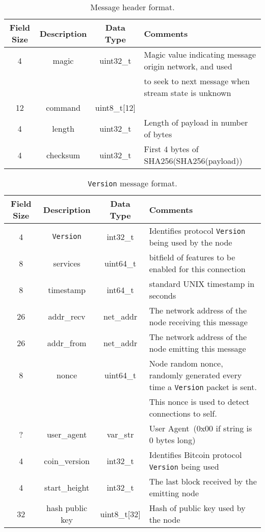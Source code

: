 \begin{table*}
\begin{center}
\caption{Message header format.}
\label{tab:msg-header}
    \begin{tabular}{|c|c|c|l|} \hline
    \textbf{Field Size} & {\bf Description} & {\bf Data Type} & {\bf Comments} \\ \hline
    4 & magic & uint32\_t & Magic value indicating message origin network, and used \\
    ~ & ~ & ~ & to seek to next message when stream state is unknown \\
    12 & command & uint8\_t[12] & ~ \\
    4 & length & uint32\_t & Length of payload in number of bytes \\
    4 & checksum & uint32\_t & First 4 bytes of SHA256(SHA256(payload)) \\ \hline
    \end{tabular}
\end{center}
\end{table*}

\begin{table*}[ht!]
\begin{center}
\caption{{\tt Version} message format.}
\label{tab:msg-version}
    \begin{tabular}{|c|c|c|l|} \hline
    \textbf{Field Size} & {\bf Description} & {\bf Data Type} & {\bf Comments} \\ \hline
    4 & {\tt Version} & int32\_t & Identifies protocol {\tt Version} being used by the node \\
    8 & services & uint64\_t & bitfield of features to be enabled for this connection \\
    8 & timestamp & int64\_t & standard UNIX timestamp in seconds \\
    26 & addr\_recv & net\_addr & The network address of the node receiving this message \\
    26 & addr\_from & net\_addr & The network address of the node emitting this message \\
    8 & nonce & uint64\_t & Node random nonce, randomly generated every time a {\tt Version} packet is sent. \\
    ~ & ~ & ~ & This nonce is used to detect connections to self.
 \\
    ? & user\_agent & var\_str & User Agent (0x00 if string is 0 bytes long) \\
    4 & coin\_version & int32\_t & Identifies Bitcoin protocol {\tt Version} being used \\
    4 & start\_height & int32\_t & The last block received by the emitting node \\
    32 & hash public key & uint8\_t[32] & Hash of public key used by the node \\ \hline
    \end{tabular}
\end{center}
\end{table*}

